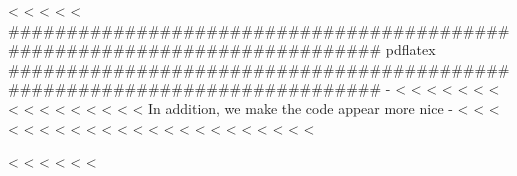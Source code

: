 <%
<%
<%
\else
<%
<%
###########################################################################
pdflatex
###########################################################################
-%
<%
<%
<%
<%
<%
<%
<%
<%
<%
<%
<%
<%
<%
<%
<%
<%
In addition, we make the code appear more nice -%
<%
<%
<%
<%
<%
<%
<%
<%
<%
<%
<%
<%
<%
<%
<%
<%
<%
<%
<%
<%
<%
<%
<%

<%
<%
<%
\fi
<%
<%
<%


